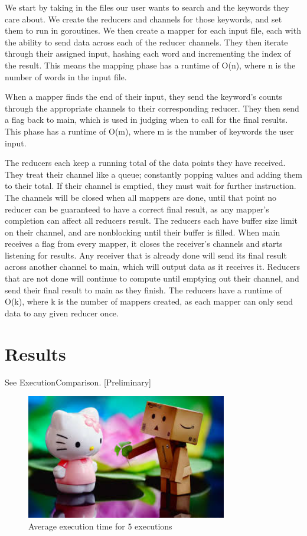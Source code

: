 \documentclass[report]{IEEEtran}
\begin{document}
We start by taking in the files our user wants to search and the keywords they care about. We create the reducers and channels for those keywords, and set them to run in goroutines. We then create a mapper for each input file, each with the ability to send data across each of the reducer channels. They then iterate through their assigned input, hashing each word and incrementing the index of the result. This means the mapping phase has a runtime of O(n), where n is the number of words in the input file.

When a mapper finds the end of their input, they send the keyword's counts through the appropriate channels to their corresponding reducer. They then send a flag back to main, which is used in judging when to call for the final results. This phase has a runtime of O(m), where m is the number of keywords the user input.

The reducers each keep a running total of the data points they have received. They treat their channel like a queue; constantly popping values and adding them to their total. If their channel is emptied, they must wait for further instruction. The channels will be closed when all mappers are done, until that point no reducer can be guaranteed to have a correct final result, as any mapper's completion can affect all reducers result. The reducers each have buffer size limit on their channel, and are nonblocking until their buffer is filled. When main receives a flag from every mapper, it closes the receiver's channels and starts listening for results. Any receiver that is already done will send its final result across another channel to main, which will output data as it receives it. Reducers that are not done will continue to compute until emptying out their channel, and send their final result to main as they finish. The reducers have a runtime of O(k), where k is the number of mappers created, as each mapper can only send data to any given reducer once.

\section{Results}
See ExecutionComparison.
[Preliminary]

\begin{figure}[h]
\centering
	\includegraphics[width = 8.75cm]{image2}
	\caption{Average execution time for 5 executions}
		
\end{figure}
\end{document}
